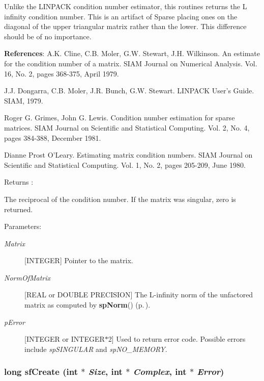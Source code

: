 Unlike the LINPACK condition number estimator, this routines returns the L infinity condition number. This is an artifact of Sparse placing ones on the diagonal of the upper triangular matrix rather than the lower. This difference should be of no importance.

{\bf References}: A.K. Cline, C.B. Moler, G.W. Stewart, J.H. Wilkinson. An estimate for the condition number of a matrix. SIAM Journal on Numerical Analysis. Vol. 16, No. 2, pages 368-375, April 1979.

J.J. Dongarra, C.B. Moler, J.R. Bunch, G.W. Stewart. LINPACK User's Guide. SIAM, 1979.

Roger G. Grimes, John G. Lewis. Condition number estimation for sparse matrices. SIAM Journal on Scientific and Statistical Computing. Vol. 2, No. 4, pages 384-388, December 1981.

Dianne Prost O'Leary. Estimating matrix condition numbers. SIAM Journal on Scientific and Statistical Computing. Vol. 1, No. 2, pages 205-209, June 1980.

\begin{Desc}
\item[Returns :]\par
[REAL or DOUBLE PRECISION] The reciprocal of the condition number. If the matrix was singular, zero is returned.\end{Desc}
\begin{Desc}
\item[Parameters: ]\par
\begin{description}
\item[{\em 
Matrix}][INTEGER] Pointer to the matrix. \item[{\em 
Norm\-Of\-Matrix}][REAL or DOUBLE PRECISION] The L-infinity norm of the unfactored matrix as computed by {\bf sp\-Norm}() {\rm (p.\,\pageref{spUtils_8c_a21})}. \item[{\em 
p\-Error}][INTEGER or INTEGER$\ast$2] Used to return error code. Possible errors include {\em sp\-SINGULAR} and {\em sp\-NO\_\-MEMORY}. \end{description}
\end{Desc}
\subsubsection{\setlength{\rightskip}{0pt plus 5cm}long sf\-Create (int $\ast$ {\em Size}, int $\ast$ {\em Complex}, int $\ast$ {\em Error})}\label{spFortran_8c_a47}


